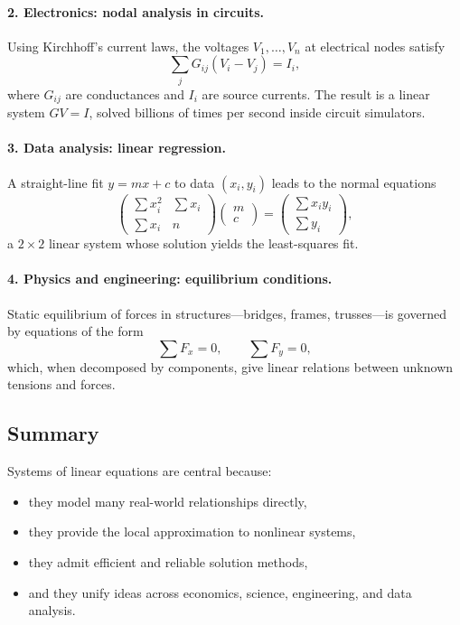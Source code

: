 \paragraph{2. Electronics: nodal analysis in circuits.}
Using Kirchhoff’s current laws, the voltages $V_1,\dots,V_n$ at electrical
nodes satisfy
\[
\sum_{j} G_{ij}(V_i - V_j) = I_i,
\]
where $G_{ij}$ are conductances and $I_i$ are source currents.  The result
is a linear system $GV=I$, solved billions of times per second inside
circuit simulators.

\paragraph{3. Data analysis: linear regression.}
A straight-line fit $y = mx + c$ to data $(x_i,y_i)$ leads to the normal
equations
\[
\begin{pmatrix}
\sum x_i^2 & \sum x_i\\[4pt]
\sum x_i   & n
\end{pmatrix}
\begin{pmatrix} m \\ c \end{pmatrix}
=
\begin{pmatrix}
\sum x_i y_i \\[4pt]
\sum y_i
\end{pmatrix},
\]
a $2\times 2$ linear system whose solution yields the least-squares fit.

\paragraph{4. Physics and engineering: equilibrium conditions.}
Static equilibrium of forces in structures---bridges, frames, trusses---is
governed by equations of the form
\[
\sum F_{x}=0,\qquad \sum F_{y}=0,
\]
which, when decomposed by components, give linear relations between unknown
tensions and forces.

\subsection*{Summary}

Systems of linear equations are central because:

\begin{itemize}
\item they model many real-world relationships directly,
\item they provide the local approximation to nonlinear systems,
\item they admit efficient and reliable solution methods,
\item and they unify ideas across economics, science, engineering, and data analysis.
\end{itemize}

